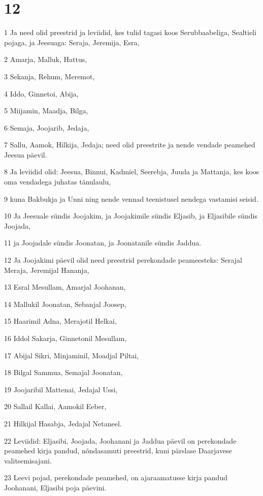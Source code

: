 \chapter{12}

\par 1 Ja need olid preestrid ja leviidid, kes tulid tagasi koos Serubbaabeliga, Sealtieli pojaga, ja Jeesuaga: Seraja, Jeremija, Esra,
\par 2 Amarja, Malluk, Hattus,
\par 3 Sekanja, Rehum, Meremot,
\par 4 Iddo, Ginnetoi, Abija,
\par 5 Miijamin, Maadja, Bilga,
\par 6 Semaja, Joojarib, Jedaja,
\par 7 Sallu, Aamok, Hilkija, Jedaja; need olid preestrite ja nende vendade peamehed Jeesua päevil.
\par 8 Ja leviidid olid: Jeesua, Binnui, Kadmiel, Seerebja, Juuda ja Mattanja, kes koos oma vendadega juhatas tänulaulu,
\par 9 kuna Bakbukja ja Unni ning nende vennad teenistusel nendega vastamisi seisid.
\par 10 Ja Jeesuale sündis Joojakim, ja Joojakimile sündis Eljasib, ja Eljasibile sündis Joojada,
\par 11 ja Joojadale sündis Joonatan, ja Joonatanile sündis Jaddua.
\par 12 Ja Joojakimi päevil olid need preestrid perekondade peameesteks: Serajal Meraja, Jeremijal Hananja,
\par 13 Esral Mesullam, Amarjal Joohanan,
\par 14 Mallukil Joonatan, Sebanjal Joosep,
\par 15 Haarimil Adna, Merajotil Helkai,
\par 16 Iddol Sakarja, Ginnetonil Mesullam,
\par 17 Abijal Sikri, Minjaminil, Moadjal Piltai,
\par 18 Bilgal Sammua, Semajal Joonatan,
\par 19 Joojaribil Mattenai, Jedajal Ussi,
\par 20 Sallail Kallai, Aamokil Eeber,
\par 21 Hilkijal Hasabja, Jedajal Netaneel.
\par 22 Leviidid: Eljasibi, Joojada, Joohanani ja Jaddua päevil on perekondade peamehed kirja pandud, nõndasamuti preestrid, kuni pärslase Daarjavese valitsemisajani.
\par 23 Leevi pojad, perekondade peamehed, on ajaraamatusse kirja pandud Joohanani, Eljasibi poja päevini.
